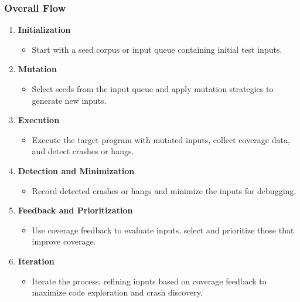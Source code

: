 \documentclass{beamer}
\begin{document}
\begin{frame}
\frametitle{Overall Flow}
 
\begin{enumerate}
    \item \textbf{Initialization}
    \begin{itemize}
        \item Start with a seed corpus or input queue containing initial test inputs.
    \end{itemize}
    
    \item \textbf{Mutation}
    \begin{itemize}
        \item Select seeds from the input queue and apply mutation strategies to generate new inputs.
    \end{itemize}
    
    \item \textbf{Execution}
    \begin{itemize}
        \item Execute the target program with mutated inputs, collect coverage data, and detect crashes or hangs.
    \end{itemize}
    
    \item \textbf{Detection and Minimization}
    \begin{itemize}
        \item Record detected crashes or hangs and minimize the inputs for debugging.
    \end{itemize}
    
    \item \textbf{Feedback and Prioritization}
    \begin{itemize}
        \item Use coverage feedback to evaluate inputs, select and prioritize those that improve coverage.
    \end{itemize}
    
    \item \textbf{Iteration}
    \begin{itemize}
        \item Iterate the process, refining inputs based on coverage feedback to maximize code exploration and crash discovery.
    \end{itemize}
\end{enumerate}
 
\end{frame}
\end{document}
